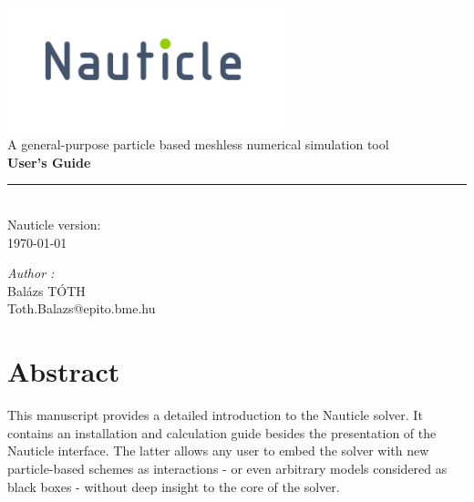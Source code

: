\documentclass[a4paper,12pt,openany]{book}
\theoremstyle{break}
\begin{document}
\frontmatter
\begin{titlepage}
\begin{center}
\vspace{5cm}
\includegraphics[width=0.6\textwidth]{nauticle_logo.pdf}\\[0.5cm]
{\large A general-purpose particle based meshless numerical simulation tool}\\ [5cm]
{ \huge \bfseries User's Guide \\[0.2cm] }
\color{nauticlegreen}
\rule{\linewidth}{1.5mm} \\[0.5cm]
\color{black}
{\large Nauticle version: \nauticleversion{} \\ \today}
\vfill
\noindent
\begin{minipage}{1\textwidth}
  \begin{flushright} \large
    \emph{Author :}\\
    Balázs TÓTH \\
    Toth.Balazs@epito.bme.hu
  \end{flushright}
\end{minipage}
\end{center}
\end{titlepage}
\clearpage\mbox{}\clearpage
\chapter{Abstract}
This manuscript provides a detailed introduction to the Nauticle solver. It contains an installation and calculation guide besides the presentation of the Nauticle interface. The latter allows any user to embed the solver with new particle-based schemes as interactions - or even arbitrary models considered as black boxes - without deep insight to the core of the solver.

\tableofcontents
\newpage
\mainmatter

\raggedbottom
\end{document}

